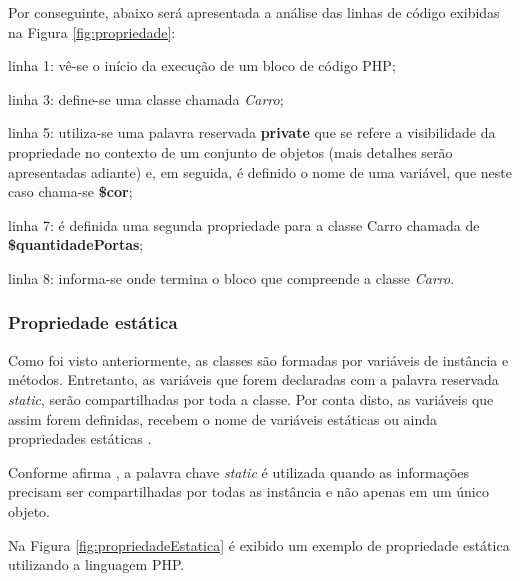 \FloatBarrier 	%

Por conseguinte, abaixo será apresentada a análise das linhas de código
exibidas na Figura \ref{fig:propriedade}:

\begin{alineas}
    \item linha 1: vê-se o início da execução de um bloco de código PHP;
    \item linha 3: define-se uma classe chamada \textit{Carro};
    \item linha 5: utiliza-se uma palavra reservada \textbf{private} que se
    refere a visibilidade da propriedade no contexto de um conjunto de objetos
    (mais detalhes serão apresentadas adiante) e, em seguida, é definido o nome
    de uma variável, que neste caso chama-se \textbf{\$cor};
    \item linha 7: é definida uma segunda propriedade para a classe
    Carro chamada de \textbf{\$quantidadePortas};
    \item linha 8: informa-se onde termina o bloco que compreende a
    classe \textit{Carro}.
\end{alineas}

\subsubsection{Propriedade estática}

Como foi visto anteriormente, as classes são formadas por variáveis de instância
e métodos. Entretanto, as variáveis que forem declaradas com a palavra reservada
\textit{static}, serão compartilhadas por toda a classe. Por conta disto, as
variáveis que assim forem definidas, recebem o nome de variáveis estáticas ou ainda
propriedades estáticas \cite{learningJava}.

Conforme afirma , a palavra chave \textit{static}
é utilizada quando as informações precisam ser compartilhadas por todas
as instância e não apenas em um único objeto.

Na Figura \ref{fig:propriedadeEstatica} é exibido um exemplo de propriedade
estática utilizando a linguagem \acs{PHP}.

